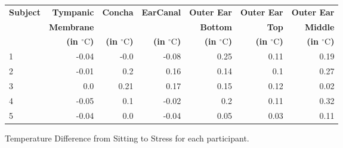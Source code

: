 \begin{figure}[t]
    \centering
    
    \begin{subtable}{\textwidth}
        \centering
        \begin{tabular}{|l|rrrrrr|}
        \hline
        \textbf{Subject} & \textbf{Tympanic} & \textbf{Concha} & \textbf{EarCanal} & \textbf{Outer Ear} & \textbf{Outer Ear} & \textbf{Outer Ear} \\
             & \textbf{Membrane} &  &  & \textbf{Bottom} & \textbf{Top} & \textbf{Middle} \\   
             &\textbf{(in \(^\circ\text{C}\))} & \textbf{(in \(^\circ\text{C}\))} & \textbf{(in \(^\circ\text{C}\))} & \textbf{(in \(^\circ\text{C}\))} & \textbf{(in \(^\circ\text{C}\))} & \textbf{(in \(^\circ\text{C}\))} \\
        \hline
        1 & -0.04 & -0.0 & -0.08 & 0.25 & 0.11 & 0.19 \\
        2 & -0.01 & 0.2 & 0.16 & 0.14 & 0.1 & 0.27 \\
        3 & 0.0 & 0.21 & 0.17 & 0.15 & 0.12 & 0.02 \\
        4 & -0.05 & 0.1 & -0.02 & 0.2 & 0.11 & 0.32 \\
        5 & -0.04 & 0.0 & -0.04 & 0.05 & 0.03 & 0.11 \\
        \hline
        \end{tabular}
        \caption{Temperature Difference from Sitting to Stress for each participant.}
        \label{subsec:Evaluation:Study2:Hypothesis1:temp_diff_sitting_to_stress_all}
    \end{subtable}
    
    \vspace{1em} %
    

\end{figure}
